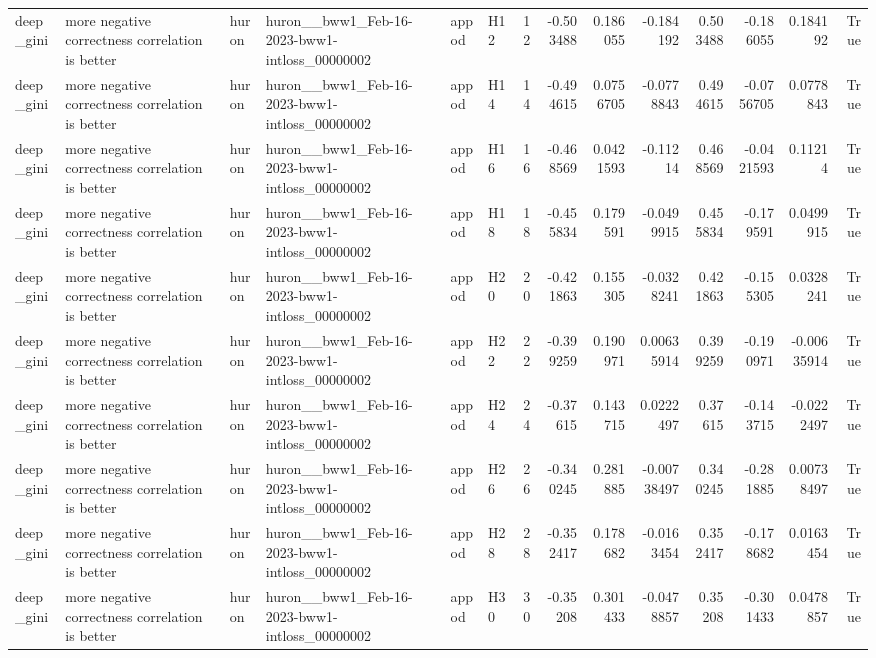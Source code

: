\begin{longtable}{llllllrrrrrrrr}
deep\_gini & more negative correctness correlation is better & huron & huron\_\_bww1\_Feb-16-2023-bww1-intloss\_00000002 & appod & H12 & 12 & -0.503488 & 0.186055 & -0.184192 & 0.503488 & -0.186055 & 0.184192 & True \\
deep\_gini & more negative correctness correlation is better & huron & huron\_\_bww1\_Feb-16-2023-bww1-intloss\_00000002 & appod & H14 & 14 & -0.494615 & 0.0756705 & -0.0778843 & 0.494615 & -0.0756705 & 0.0778843 & True \\
deep\_gini & more negative correctness correlation is better & huron & huron\_\_bww1\_Feb-16-2023-bww1-intloss\_00000002 & appod & H16 & 16 & -0.468569 & 0.0421593 & -0.11214 & 0.468569 & -0.0421593 & 0.11214 & True \\
deep\_gini & more negative correctness correlation is better & huron & huron\_\_bww1\_Feb-16-2023-bww1-intloss\_00000002 & appod & H18 & 18 & -0.455834 & 0.179591 & -0.0499915 & 0.455834 & -0.179591 & 0.0499915 & True \\
deep\_gini & more negative correctness correlation is better & huron & huron\_\_bww1\_Feb-16-2023-bww1-intloss\_00000002 & appod & H20 & 20 & -0.421863 & 0.155305 & -0.0328241 & 0.421863 & -0.155305 & 0.0328241 & True \\
deep\_gini & more negative correctness correlation is better & huron & huron\_\_bww1\_Feb-16-2023-bww1-intloss\_00000002 & appod & H22 & 22 & -0.399259 & 0.190971 & 0.00635914 & 0.399259 & -0.190971 & -0.00635914 & True \\
deep\_gini & more negative correctness correlation is better & huron & huron\_\_bww1\_Feb-16-2023-bww1-intloss\_00000002 & appod & H24 & 24 & -0.37615 & 0.143715 & 0.0222497 & 0.37615 & -0.143715 & -0.0222497 & True \\
deep\_gini & more negative correctness correlation is better & huron & huron\_\_bww1\_Feb-16-2023-bww1-intloss\_00000002 & appod & H26 & 26 & -0.340245 & 0.281885 & -0.00738497 & 0.340245 & -0.281885 & 0.00738497 & True \\
deep\_gini & more negative correctness correlation is better & huron & huron\_\_bww1\_Feb-16-2023-bww1-intloss\_00000002 & appod & H28 & 28 & -0.352417 & 0.178682 & -0.0163454 & 0.352417 & -0.178682 & 0.0163454 & True \\
deep\_gini & more negative correctness correlation is better & huron & huron\_\_bww1\_Feb-16-2023-bww1-intloss\_00000002 & appod & H30 & 30 & -0.35208 & 0.301433 & -0.0478857 & 0.35208 & -0.301433 & 0.0478857 & True \\

\end{longtable}
